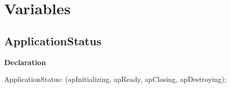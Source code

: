 \documentclass{report}
\begin{document}
\section{Variables}
\subsection*{ApplicationStatus}
\begin{list}{}{
\setlength{\itemindent}{0cm}
\setlength{\listparindent}{0cm}
\setlength{\leftmargin}{\evensidemargin}
\addtolength{\leftmargin}{\tmplength}
\settowidth{\labelsep}{X}
\addtolength{\leftmargin}{\labelsep}
\setlength{\labelwidth}{\tmplength}
}
\begin{flushleft}
\item[\textbf{Declaration}\hfill]
\begin{ttfamily}
ApplicationStatus: (apInitializing, apReady, apClosing, apDestroying);\end{ttfamily}


\end{flushleft}
\end{list}
\end{document}
